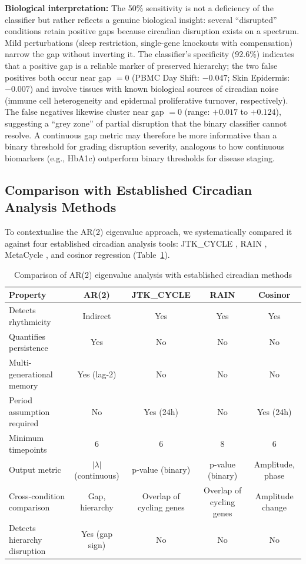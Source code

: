 \documentclass[11pt,a4paper]{article}
\begin{document}
\textbf{Biological interpretation:} The 50\% sensitivity is not a deficiency of the classifier but rather reflects a genuine biological insight: several ``disrupted'' conditions retain positive gaps because circadian disruption exists on a spectrum. Mild perturbations (sleep restriction, single-gene knockouts with compensation) narrow the gap without inverting it. The classifier's specificity (92.6\%) indicates that a positive gap is a reliable marker of preserved hierarchy; the two false positives both occur near gap $= 0$ (PBMC Day Shift: $-0.047$; Skin Epidermis: $-0.007$) and involve tissues with known biological sources of circadian noise (immune cell heterogeneity and epidermal proliferative turnover, respectively). The false negatives likewise cluster near gap $= 0$ (range: $+0.017$ to $+0.124$), suggesting a ``grey zone'' of partial disruption that the binary classifier cannot resolve. A continuous gap metric may therefore be more informative than a binary threshold for grading disruption severity, analogous to how continuous biomarkers (e.g., HbA1c) outperform binary thresholds for disease staging.

\subsection{Comparison with Established Circadian Analysis Methods}

To contextualise the AR(2) eigenvalue approach, we systematically compared it against four established circadian analysis tools: JTK\_CYCLE \citep{hughes2010jtk}, RAIN \citep{thaben2014rain}, MetaCycle \citep{wu2016metacycle}, and cosinor regression (Table~\ref{tab:method_comparison}).

\begin{table}[H]
\centering
\caption{Comparison of AR(2) eigenvalue analysis with established circadian methods}
\label{tab:method_comparison}
\begin{tabular}{@{}lcccc@{}}
\toprule
\textbf{Property} & \textbf{AR(2)} & \textbf{JTK\_CYCLE} & \textbf{RAIN} & \textbf{Cosinor} \\
\midrule
Detects rhythmicity & Indirect & Yes & Yes & Yes \\
Quantifies persistence & Yes & No & No & No \\
Multi-generational memory & Yes (lag-2) & No & No & No \\
Period assumption required & No & Yes (24h) & No & Yes (24h) \\
Minimum timepoints & 6 & 6 & 8 & 6 \\
Output metric & $|\lambda|$ (continuous) & p-value (binary) & p-value (binary) & Amplitude, phase \\
Cross-condition comparison & Gap, hierarchy & Overlap of cycling genes & Overlap of cycling genes & Amplitude change \\
Detects hierarchy disruption & Yes (gap sign) & No & No & No \\
\bottomrule
\end{tabular}
\end{table}
\end{document}
